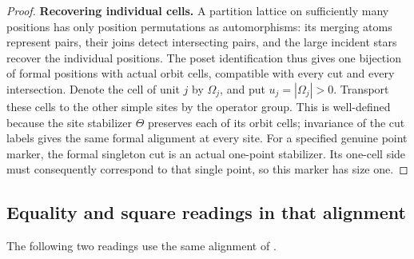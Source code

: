 \begin{proof}
\noindent\textbf{Recovering individual cells.}
A partition lattice on sufficiently many positions has only
position permutations as automorphisms: its merging atoms represent
pairs, their joins detect intersecting pairs, and the large incident
stars recover the individual positions.  The poset identification
thus gives one bijection of formal positions with actual orbit cells,
compatible with every cut and every intersection.  Denote the cell
of unit \(j\) by \(\Omega_j\), and put \(u_j=|\Omega_j|>0\).
Transport these cells to the other simple sites by the operator group.
This is well-defined because the site stabilizer \(\Theta\) preserves
each of its orbit cells; invariance of the cut labels gives the same
formal alignment at every site.
For a specified genuine point marker, the formal singleton cut is
an actual one-point stabilizer.  Its one-cell side must consequently
correspond to that single point, so this marker has size one.
\end{proof}

\subsection{Equality and square readings in that alignment}

The following two readings use the same alignment of .


